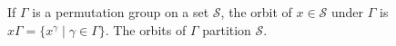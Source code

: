 If $\Gamma$ is a permutation group on a set $\mathcal{S}$, the orbit of $x \in \mathcal{S}$ under $\Gamma$ is $x\Gamma = \{x^\gamma \mid \gamma \in \Gamma\}$. The orbits of $\Gamma$ partition $\mathcal{S}$.
